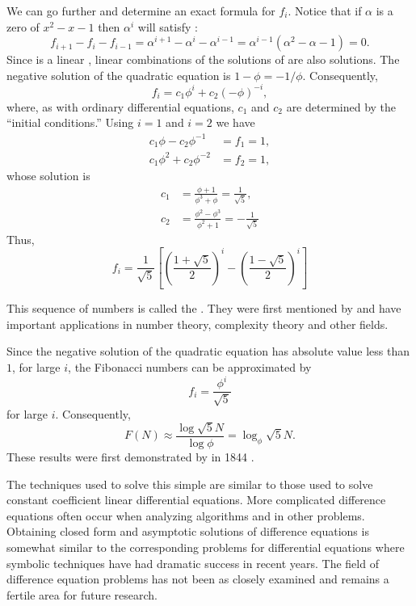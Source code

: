 We can go further and determine an exact formula for $f_i$.  Notice that if
$\alpha$ is a zero of $x^{2} -x -1$ then $\alpha^{i}$ will satisfy
: 
\[
f_{i+1} - f_{i} - f_{i-1} = \alpha^{i+1} - \alpha^{i} - \alpha^{i-1}
 = \alpha^{i-1} ( \alpha^{2} - \alpha -1) = 0.
\]
Since  is a linear ,
linear combinations of the solutions of  are also
solutions.  The negative solution of the quadratic equation is $1-\phi
= -1/\phi$. Consequently,
\[
f_i = c_1 \phi^i + c_2 (-\phi)^{-i},
\]
where, as with ordinary differential equations, $c_1$ and $c_2$ are
determined by the ``initial conditions.''  Using $i = 1$ and $i=2$ we
have
\[
\begin{aligned}
  c_1 \phi - c_2 \phi^{-1} &= f_{1} = 1,\\
  c_1 \phi^2 + c_2 \phi^{-2}&= f_{2} = 1,
\end{aligned}
\]
whose solution is
\[
\begin{aligned}
  c_1 &= \frac{\phi +1}{\phi^3 +\phi} = \frac{1}{\sqrt{5}},\\
  c_2&=\frac{\phi^2 - \phi^3}{\phi^2 + 1} = - \frac{1}{\sqrt{5}}
\end{aligned}
\]
Thus,
\[
f_i = 
\frac{1}{\sqrt{5}} \left[
\left(\frac{1 + \sqrt{5}}{2}\right)^i -
        \left(\frac{1 - \sqrt{5}}{2}\right)^i \right]
\]

This sequence of numbers is called the .  They
were first mentioned by {\Fibonacci} \cite[pages 283--285]{Pisano1857-nc}
and have important applications in number theory, complexity theory
and other fields.

Since the negative solution of the quadratic equation has absolute
value less than $1$, for large $i$, the Fibonacci numbers can be
approximated by
\[
f_i = \frac{\phi^i}{\sqrt{5}}
\]
for large $i$. Consequently,
\[
F(N) \approx \frac{\log \sqrt{5} N}{\log \phi} = \log_{\phi} \sqrt{5} N.
\]
These results were first demonstrated  by {\Lame} in 1844 \cite{Lame1844-wm}.

The techniques used to solve this simple  are
similar to those used to solve constant coefficient linear
differential equations.  More complicated difference equations often
occur when analyzing algorithms and in other problems.  Obtaining
closed form and asymptotic solutions of difference equations is
somewhat similar to the corresponding problems for differential
equations where symbolic techniques have had dramatic success in
recent years.  The field of difference equation problems has not been
as closely examined and remains a fertile area for future research.

